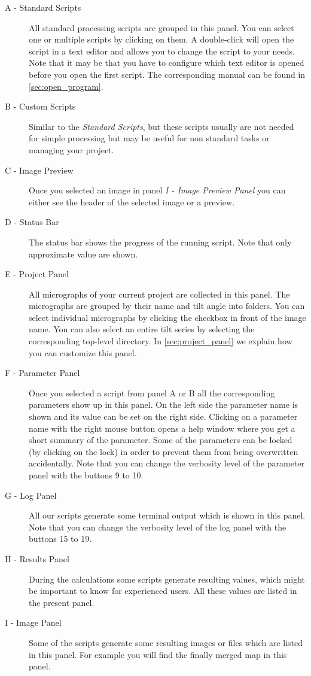 \begin{description}
	\item[A - Standard Scripts] All standard processing scripts are grouped in this panel. You can select one or multiple scripts by clicking on them. A double-click will open the script in a text editor and allows you to change the script to your needs. Note that it may be that you have to configure which text editor is opened before you open the first script. The corresponding manual can be found in \autoref{sec:open_program}.
	\item[B - Custom Scripts] Similar to the \textit{Standard Scripts}, but these scripts usually are not needed for simple processing but may be useful for non standard tasks or managing your project.
	\item[C - Image Preview] Once you selected an image in panel \textit{I - Image Preview Panel} you can either see the header of the selected image or a preview.
	\item[D - Status Bar] The status bar shows the progress of the running script. Note that only approximate value are shown.
	\item[E - Project Panel] All micrographs of your current project are collected in this panel. The micrographs are grouped by their name and tilt angle into folders. You can select individual micrographs by clicking the checkbox in front of the image name. You can also select an entire tilt series by selecting the corresponding top-level directory. In \autoref{sec:project_panel} we explain how you can customize this panel.
	\item[F - Parameter Panel] Once you selected a script from panel A or B all the corresponding parameters show up in this panel. On the left side the parameter name is shown and its value can be set on the right side. Clicking on a parameter name with the right mouse button opens a help window where you get a short summary of the parameter. Some of the parameters can be locked (by clicking on the lock) in order to prevent them from being overwritten accidentally. Note that you can change the verbosity level of the parameter panel with the buttons 9 to 10. 
	\item[G - Log Panel] All our scripts generate some terminal output which is shown in this panel. Note that you can change the verbosity level of the log panel with the buttons 15 to 19.  
	\item[H - Results Panel] During the calculations some scripts generate resulting values, which might be important to know for experienced users. All these values are listed in the present panel.
	\item[I - Image Panel] Some of the scripts generate some resulting images or files which are listed in this panel. For example you will find the finally merged map in this panel.
\end{description}

